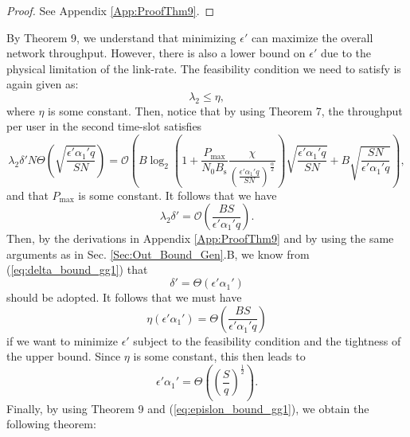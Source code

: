 \documentclass[journal,draftclsnofoot,onecolumn,12pt,twoside]{IEEEtran}
\begin{document}
\begin{proof}
See Appendix \ref{App:ProofThm9}.
\end{proof}

By Theorem 9, we understand that minimizing $\epsilon'$ can maximize the overall network throughput. However, there is also a lower bound on $\epsilon'$ due to the physical limitation of the link-rate. The feasibility condition we need to satisfy is again given as:
\begin{equation}\label{eq:lambda2_feas_gg1}
\lambda_2\leq\eta,
\end{equation}
where $\eta$ is some constant. Then, notice that by using Theorem 7, the throughput per user in the second time-slot satisfies
\begin{equation}
\lambda_2\delta' N\Theta\left(\sqrt{\frac{\epsilon'\alpha_1'q}{SN}}\right)=\mathcal{O}\left(B\log_2\left(1+\frac{P_{\text{max}}}{N_0B_{\text{s}}}\frac{\chi}{\left(\frac{\epsilon'\alpha_1'q}{SN}\right)^\frac{\alpha}{2}}\right)\sqrt{\frac{\epsilon'\alpha_1'q}{SN}}+B\sqrt{\frac{SN}{\epsilon'\alpha_1'q}}\right),
\end{equation}
and that $P_{\text{max}}$ is some constant. It follows that we have
\begin{equation}\label{eq:delta_bound_gg1_2}
\lambda_2\delta'=\mathcal{O}\left(\frac{BS}{\epsilon'\alpha_1'q}\right).
\end{equation}
Then, by the derivations in Appendix \ref{App:ProofThm9} and by using the same arguments as in Sec. \ref{Sec:Out_Bound_Gen}.B, we know from (\ref{eq:delta_bound_gg1}) that
\begin{equation}
\delta'=\Theta\left(\epsilon'\alpha_1'\right)
\end{equation}
should be adopted. It follows that we must have
\begin{equation}
\eta(\epsilon'\alpha_1')=\Theta\left(\frac{BS}{\epsilon'\alpha_1'q}\right)
\end{equation}
if we want to minimize $\epsilon'$ subject to the feasibility condition and the tightness of the upper bound. Since $\eta$ is some constant, this then leads to
\begin{equation}\label{eq:epislon_bound_gg1}
\epsilon'\alpha_1'=\Theta\left(\left(\frac{S}{q}\right)^{\frac{1}{2}}\right).
\end{equation}
Finally, by using Theorem 9 and (\ref{eq:epislon_bound_gg1}), we obtain the following theorem:
\end{document}
